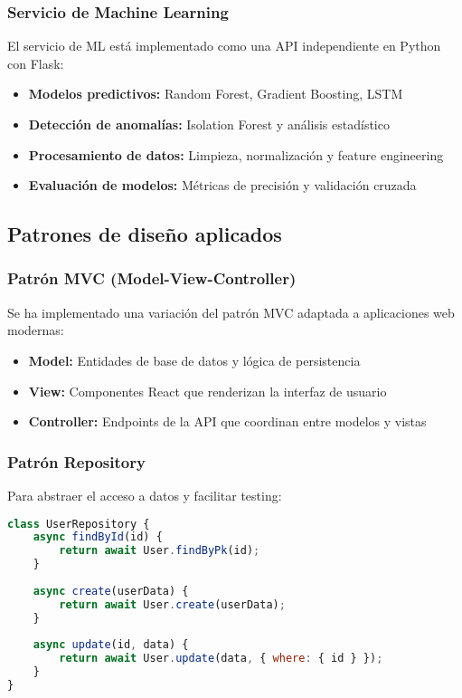 \subsubsection{Servicio de Machine Learning}

El servicio de ML está implementado como una API independiente en Python con Flask:

\begin{itemize}
    \item \textbf{Modelos predictivos:} Random Forest, Gradient Boosting, LSTM
    \item \textbf{Detección de anomalías:} Isolation Forest y análisis estadístico
    \item \textbf{Procesamiento de datos:} Limpieza, normalización y feature engineering
    \item \textbf{Evaluación de modelos:} Métricas de precisión y validación cruzada
\end{itemize}

\subsection{Patrones de diseño aplicados}

\subsubsection{Patrón MVC (Model-View-Controller)}

Se ha implementado una variación del patrón MVC adaptada a aplicaciones web modernas:

\begin{itemize}
    \item \textbf{Model:} Entidades de base de datos y lógica de persistencia
    \item \textbf{View:} Componentes React que renderizan la interfaz de usuario
    \item \textbf{Controller:} Endpoints de la API que coordinan entre modelos y vistas
\end{itemize}

\subsubsection{Patrón Repository}

Para abstraer el acceso a datos y facilitar testing:

\begin{lstlisting}[language=JavaScript, caption=Ejemplo del patrón Repository]
class UserRepository {
    async findById(id) {
        return await User.findByPk(id);
    }
    
    async create(userData) {
        return await User.create(userData);
    }
    
    async update(id, data) {
        return await User.update(data, { where: { id } });
    }
}
\end{lstlisting}

